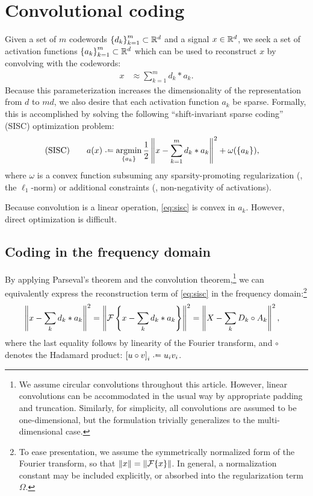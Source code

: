 \documentclass{article} %
\begin{document}
\section{Convolutional coding}
\label{sec:convcode}
Given a set of $m$ codewords ${\{d_k\}}_{k=1}^m \subset \mathbb{R}^d$ and a signal $x\in\mathbb{R}^d$, 
we seek a set of activation functions ${\{a_k\}}_{k=1}^m\subset\mathbb{R}^d$ which
can be used to reconstruct $x$ by convolving with the codewords:
\begin{align}
x &\approx \sum_{k=1}^m d_k * a_k.\label{eq:convapprox}
\end{align}
Because this parameterization increases the dimensionality of the representation from $d$ 
to $md$, we also desire that each activation function $a_k$ be sparse.  
Formally, this is accomplished by solving the following ``shift-invariant sparse
coding'' (SISC) optimization problem:
\begin{align}
\text{(SISC)}\quad\quad a(x) &\defeq \argmin_{\{a_k\}} \frac{1}{2} \left\|x - \sum_{k=1}^m d_k * a_k\right\|^2 +
\omega(\{a_k\}), \label{eq:sisc}
\end{align}
where $\omega$ is a convex function subsuming any sparsity-promoting regularization 
(\eg, the $\ell_1$-norm) or additional constraints (\eg, non-negativity of activations).

Because convolution is a linear operation, \eqref{eq:sisc} is convex in $a_k$.  
However, direct optimization is difficult.

\subsection{Coding in the frequency domain}
By applying Parseval's theorem and the convolution theorem,\footnote{We assume circular
convolutions throughout this article. However, linear convolutions can be accommodated
in the usual way by appropriate padding and truncation. Similarly, for simplicity, all 
convolutions are assumed to be one-dimensional, but the formulation trivially
generalizes to the multi-dimensional case.} we can equivalently express the 
reconstruction term of \eqref{eq:sisc} in the frequency domain:\footnote{To ease
presentation, we assume the symmetrically normalized form of the Fourier transform, 
so that $\|x\| = \|\mathcal{F}\{x\}\|$. In general, a normalization constant may be included
explicitly, or absorbed into the regularization term $\Omega$.}
\begin{align}
\left\|x - \sum_k d_k * a_k\right\|^2 &= \left\|\mathcal{F}\left\{x - \sum_k d_k *
a_k\right\}\right\|^2
= \left\| X - \sum_k D_k \circ A_k\right\|^2,\label{eq:fourier}
\end{align}
where the last equality follows by linearity of the Fourier transform, and $\circ$
denotes the Hadamard product: ${[u\circ v]}_i \defeq u_i v_i$.
\end{document}
